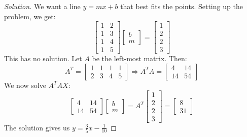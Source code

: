 \documentclass[crop=false,class=book,oneside]{standalone}                      %
\begin{document}
        \begin{proof}[Solution]
        We want a line $y=mx+b$ that best fits the points. Setting up the problem, we get:
        \begin{equation*}
            \begin{bmatrix} 1 & 2 \\ 1 & 3 \\ 1 & 4 \\ 1 & 5 \end{bmatrix} \begin{bmatrix} b \\ m \end{bmatrix} = \begin{bmatrix} 1 \\ 2 \\ 2 \\ 3\end{bmatrix}   
        \end{equation*}
        This has no solution. Let $A$ be the left-most matrix. Then:
        \begin{equation*}
            A^T = \begin{bmatrix} 1 & 1 & 1 & 1 \\ 2 & 3 & 4 & 5 \end{bmatrix}\Rightarrow A^{T}A = \begin{bmatrix} 4 & 14 \\ 14 & 54 \end{bmatrix}
        \end{equation*}
        We now solve $A^{T}AX$:
        \begin{equation*}
            \begin{bmatrix} 4 & 14 \\ 14 & 54 \end{bmatrix} \begin{bmatrix} b \\ m \end{bmatrix} =  A^T \begin{bmatrix} 1 \\ 2 \\ 2 \\ 3 \end{bmatrix} = \begin{bmatrix} 8 \\ 31 \end{bmatrix}   
        \end{equation*}
        The solution gives us $y = \frac{3}{5}x-\frac{1}{10}$
        \end{proof}
\end{document}

